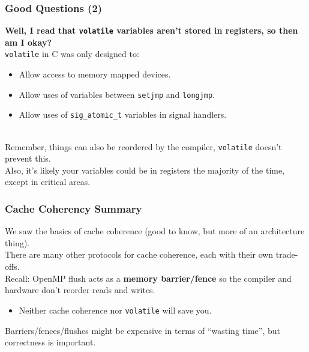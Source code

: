 \begin{frame}[fragile]
  \frametitle{Good Questions (2)}

  
  {\bf Well, I read that {\tt volatile} variables aren't stored in registers,
    so then am I okay?}\\[1em]

    {\tt volatile} in C was only designed to:
      \begin{itemize}
        \item Allow access to memory mapped devices.
        \item Allow uses of variables between {\tt setjmp} and {\tt longjmp}.
        \item Allow uses of {\tt sig\_atomic\_t} variables in signal handlers.
      \end{itemize}~\\[1em]
    Remember, things can also be reordered by the compiler,
      {\tt volatile} doesn't prevent this.\\[1em]
    Also, it's likely your variables could be in registers the majority
      of the time, except in critical areas.
  
\end{frame}

\begin{frame}
  \frametitle{Cache Coherency Summary}

  
    We saw the basics of cache coherence (good to know, but more of an architecture
      thing).\\[1em]
    There are many other protocols for cache coherence, each with their own
      trade-offs.\\[1em]

     Recall: OpenMP flush acts as a {\bf memory barrier/fence} so the
      compiler and hardware don't reorder reads and writes.\\[1em]
    \begin{itemize}
     \item Neither cache coherence nor {\tt volatile} will save you.
    \end{itemize}

Barriers/fences/flushes might be expensive in terms of ``wasting time'', but correctness is important.

  
\end{frame}



